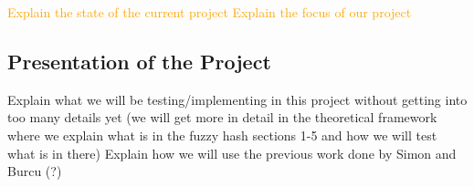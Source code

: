 \textcolor{orange}{Explain the state of the current project}\newline
\textcolor{orange}{Explain the focus of our project}\newline









\subsection{Presentation of the Project}
Explain what we will be testing/implementing in this project without getting into too many details yet (we will get more in detail in the theoretical framework where we explain what is in the fuzzy hash sections 1-5 and how we will test what is in there)
Explain how we will use the previous work done by Simon and Burcu (?) 

